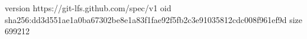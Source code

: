 version https://git-lfs.github.com/spec/v1
oid sha256:dd3d551ae1a0ba67302be8e1a83f1fae92f5fb2c3e91035812cdc008f961ef9d
size 699212
